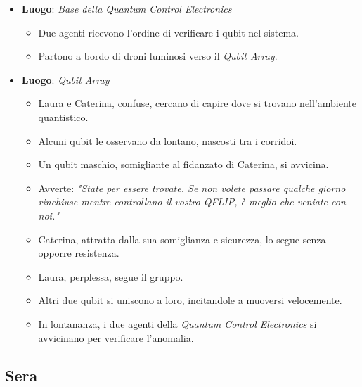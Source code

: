 \begin{itemize}
    \item \textbf{Luogo}: \emph{Base della Quantum Control Electronics}
    \begin{itemize}
        \item Due agenti ricevono l'ordine di verificare i qubit nel sistema.
        \item Partono a bordo di droni luminosi verso il \emph{Qubit Array}.
    \end{itemize}
    
    \item \textbf{Luogo}: \emph{Qubit Array}
    \begin{itemize}
        \item Laura e Caterina, confuse, cercano di capire dove si trovano nell'ambiente quantistico.
        \item Alcuni qubit le osservano da lontano, nascosti tra i corridoi.
        \item Un qubit maschio, somigliante al fidanzato di Caterina, si avvicina.
        \item Avverte: \emph{"State per essere trovate. Se non volete passare qualche giorno rinchiuse mentre controllano il vostro QFLIP, è meglio che veniate con noi."}
        \item Caterina, attratta dalla sua somiglianza e sicurezza, lo segue senza opporre resistenza.
        \item Laura, perplessa, segue il gruppo.
        \item Altri due qubit si uniscono a loro, incitandole a muoversi velocemente.
        \item In lontananza, i due agenti della \emph{Quantum Control Electronics} si avvicinano per verificare l'anomalia.
    \end{itemize}
\end{itemize}

\subsection*{Sera}

